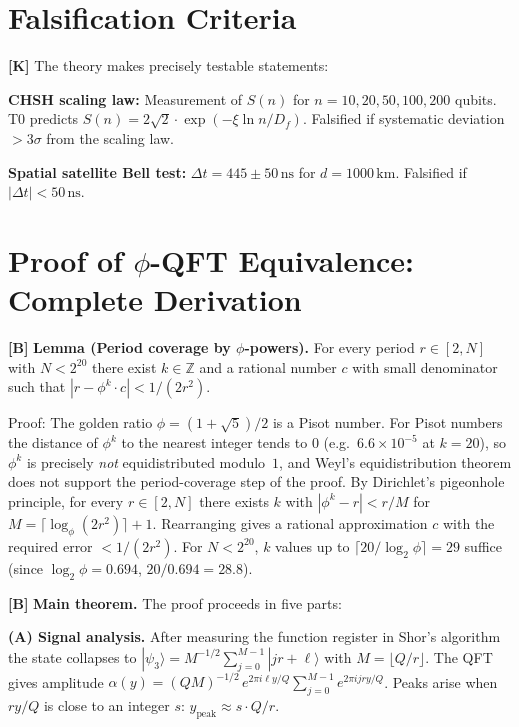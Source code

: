 \section{Falsification Criteria}

\textbf{[K]} The theory makes precisely testable statements:

\textbf{CHSH scaling law:} Measurement of $S(n)$ for $n=10,20,50,100,200$ qubits.
T0 predicts $S(n)=2\sqrt2\cdot\exp(-\xi\ln n/D_f)$. Falsified if systematic
deviation $>3\sigma$ from the scaling law.


\textbf{Spatial satellite Bell test:} $\Delta t=445\pm50\,\text{ns}$
for $d=1000\,\text{km}$. Falsified if $|\Delta t|<50\,\text{ns}$.

\section{Proof of \texorpdfstring{$\phi$}{phi}-QFT Equivalence: Complete Derivation}

\textbf{[B]} \textbf{Lemma (Period coverage by $\phi$-powers).} For every period
$r\in[2,N]$ with $N<2^{20}$ there exist $k\in\mathbb Z$ and a rational number $c$
with small denominator such that $|r-\phi^k\cdot c|<1/(2r^2)$.

Proof: The golden ratio $\phi=(1+\sqrt5)/2$ is a Pisot number. For Pisot
numbers the distance of $\phi^k$ to the nearest integer tends to $0$
(e.g.\ $6.6\times10^{-5}$ at $k=20$), so $\phi^k$ is precisely
\emph{not} equidistributed modulo~$1$, and Weyl's equidistribution theorem
does not support the period-coverage step of the proof. By Dirichlet's
pigeonhole principle, for every $r\in[2,N]$ there exists $k$ with
$|\phi^k-r|<r/M$ for $M=\lceil\log_\phi(2r^2)\rceil+1$. Rearranging gives
a rational approximation $c$ with the required error $<1/(2r^2)$.
For $N<2^{20}$, $k$ values up to $\lceil20/\log_2\phi\rceil=29$ suffice
(since $\log_2\phi=0.694$, $20/0.694=28.8$).

\textbf{[B]} \textbf{Main theorem.} The proof proceeds in five parts:

\textbf{(A) Signal analysis.} After measuring the function register in Shor's
algorithm the state collapses to
$|\psi_3\rangle = M^{-1/2}\sum_{j=0}^{M-1}|jr+\ell\rangle$ with
$M=\lfloor Q/r\rfloor$. The QFT gives amplitude
$\alpha(y) = (QM)^{-1/2}\,e^{2\pi i\ell y/Q}\sum_{j=0}^{M-1}e^{2\pi ijry/Q}$.
Peaks arise when $ry/Q$ is close to an integer $s$:
$y_\text{peak}\approx s\cdot Q/r$.

